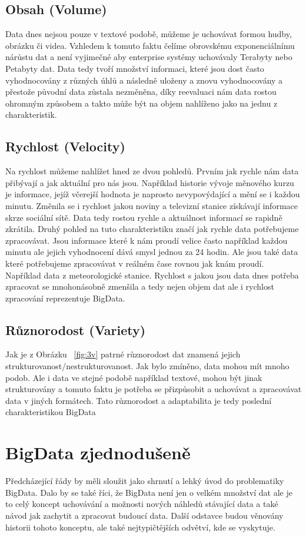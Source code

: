 \documentclass[thesis=M,czech]{FITthesis}[2012/06/26]
\begin{document}
\subsection[3v-volume]{Obsah (Volume)}
Data dnes nejsou pouze v textové podobě, můžeme je uchovávat formou hudby, obrázku či videa. Vzhledem k tomuto faktu čelíme obrovskému exponenciálnímu nárůstu dat a není vyjimečné aby enterprise systémy uchovávaly Terabyty nebo Petabyty dat. Data tedy tvoří množství informaci, které jsou dost často vyhodnocovány z různých úhlů a následně uloženy a znovu vyhodnocovány a přestože původní data zůstala nezměněna, díky reevaluaci nám data rostou ohromným způsobem a takto může být na objem nahlíženo jako na jednu z charakteristik.

\subsection{Rychlost (Velocity)}
Na rychlost můžeme nahlížet hned ze dvou pohledů. Prvním jak rychle nám data přibývají a jak aktuální pro nás jsou. Například historie vývoje měnového kurzu je informace, jejíž včerejší hodnota je naprosto nevypovýdající a mění se i každou minutu. Změnila se i rychlost jakou noviny a televizní stanice získávají informace skrze sociální sítě. Data tedy rostou rychle a aktuálnost informací se rapidně zkrátila. Druhý pohled na tuto charakteristiku značí jak rychle data potřebujeme zpracovávat. Jsou informace které k nám proudí velice často například každou minutu ale jejich vyhodnocení dává smysl jednou za 24 hodin. Ale jsou také data které potřebujeme zpracovávat v reálném čase rovnou jak knám proudí. Například data z meteorologické stanice. 
Rychlost s jakou jsou data dnes potřeba zpracovat se mnohonásobně zmenšila a tedy nejen objem dat ale i rychlost zpracování reprezentuje BigData.

\subsection{Různorodost (Variety)}
Jak je z Obrázku ~\ref{fig:3v} patrné různorodost dat znamená jejich strukturovanost/nestrukturovanost. Jak bylo zmíněno, data mohou mít mnoho podob. Ale i data ve stejné podobě například textové, mohou být jinak strukturovány a tomuto faktu je potřeba se přizpůsobit a uchovávat a zpracovávat data v jiných formátech. Tato různorodost a adaptabilita je tedy poslední charakteristikou BigData

\section{BigData zjednodušeně}
Předcházející řády by měli sloužit jako shrnutí a lehký úvod do problematiky BigData. Dalo by se také říci, že BigData není jen o velkém množství dat ale je to celý koncept uchovávání a možnosti nových náhledů stávající data a také návod jak zachytit a zpracovat budoucí data. Další odstavce budou věnovány historii tohoto konceptu, ale také nejtypičtějších odvětví, kde se vyskytuje. 
\end{document}
